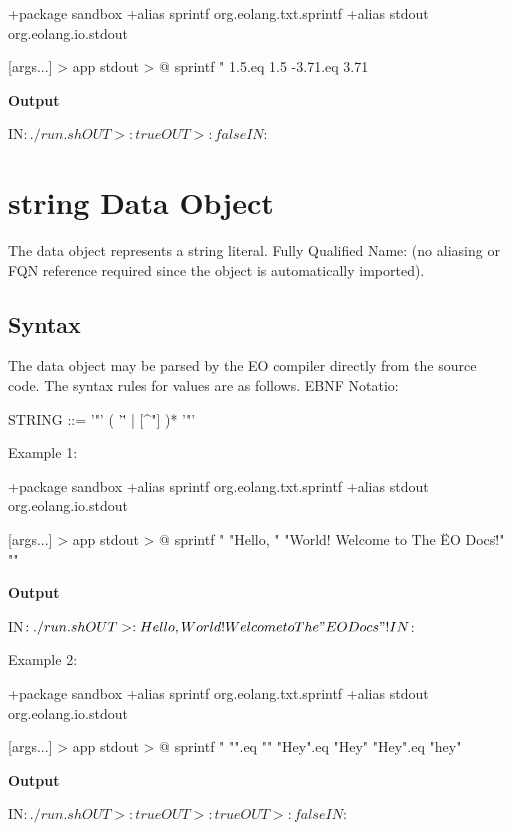 \documentclass[12pt]{book}
\begin{document}
{\begin{ffcode}
+package sandbox
+alias sprintf org.eolang.txt.sprintf
+alias stdout org.eolang.io.stdout

[args...] > app
  stdout > @
    sprintf
      "%
      1.5.eq 1.5
      -3.71.eq 3.71
\end{ffcode}
\textbf{Output}
\begin{ffcode}
IN$: ./run.sh
OUT>: true
OUT>: false
IN$: 
\end{ffcode}

\section{string Data Object}
The  data object represents a string literal.
Fully Qualified Name:  (no aliasing or FQN reference required since the object is automatically imported).

\subsection{Syntax}
The  data object may be parsed by the EO compiler directly from the source code. The syntax rules for values are as follows. EBNF Notatio:
\begin{ffcode}

STRING   ::= '"' ( '\"' | [^"] )* '"'
\end{ffcode}
Example 1:
\begin{ffcode}
+package sandbox
+alias sprintf org.eolang.txt.sprintf
+alias stdout org.eolang.io.stdout

[args...] > app
  stdout > @
    sprintf
      "%
      "Hello, "
      "World! Welcome to The \"EO Docs\"!"
      "\n"
\end{ffcode}
\textbf{Output}
\begin{ffcode}
IN$: ./run.sh
OUT>: Hello, World! Welcome to The "EO Docs"!
IN$: 
\end{ffcode}
Example 2:
\begin{ffcode}
+package sandbox
+alias sprintf org.eolang.txt.sprintf
+alias stdout org.eolang.io.stdout

[args...] > app
  stdout > @
    sprintf
      "%
      "".eq ""
      "Hey".eq "Hey"
      "Hey".eq "hey"
\end{ffcode}
\textbf{Output} 
\begin{ffcode}
IN$: ./run.sh
OUT>: true
OUT>: true
OUT>: false
IN$: 
\end{ffcode}

}
\end{document}
